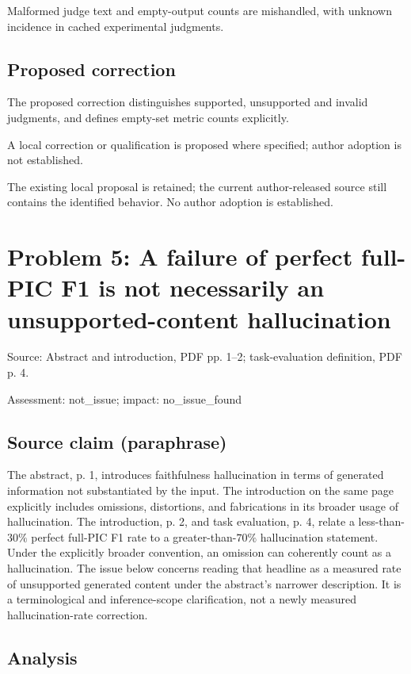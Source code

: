 \documentclass[11pt]{article}
\begin{document}
Malformed judge text and empty-output counts are mishandled, with unknown incidence in cached experimental judgments.

\subsection*{Proposed correction}

The proposed correction distinguishes supported, unsupported and invalid judgments, and defines empty-set metric counts explicitly.

A local correction or qualification is proposed where specified; author adoption is not established.

The existing local proposal is retained; the current author-released source still contains the identified behavior. No author adoption is established.

\section*{Problem 5: A failure of perfect full-PIC F1 is not necessarily an unsupported-content hallucination}

Source: Abstract and introduction, PDF pp. 1–2; task-evaluation definition, PDF p. 4.

Assessment: not\_issue; impact: no\_issue\_found

\subsection*{Source claim (paraphrase)}

The abstract, p. 1, introduces faithfulness hallucination in terms of generated information not substantiated by the input. The introduction on the same page explicitly includes omissions, distortions, and fabrications in its broader usage of hallucination. The introduction, p. 2, and task evaluation, p. 4, relate a less-than-\(30\%\) perfect full-PIC F1 rate to a greater-than-\(70\%\) hallucination statement. Under the explicitly broader convention, an omission can coherently count as a hallucination. The issue below concerns reading that headline as a measured rate of unsupported generated content under the abstract’s narrower description. It is a terminological and inference-scope clarification, not a newly measured hallucination-rate correction.

\subsection*{Analysis}
\end{document}
